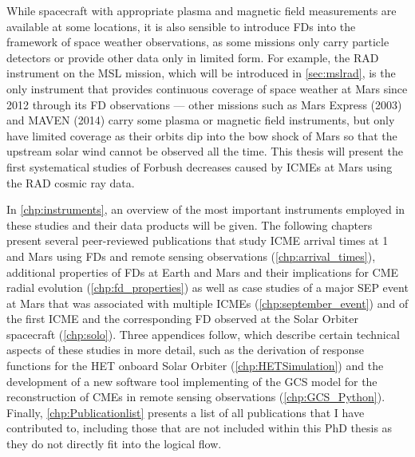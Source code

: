 While spacecraft with appropriate plasma and magnetic field measurements are available at some locations, it is also sensible to introduce \acp{FD} into the framework of space weather observations, as some missions only carry particle detectors or provide other data only in limited form. For example, the \ac{RAD} instrument on the \ac{MSL} mission, which will be introduced in \autoref{sec:mslrad}, is the only instrument that provides continuous coverage of space weather at Mars since 2012 through its \ac{FD} observations --- other missions such as Mars Express (2003) and MAVEN (2014) carry some plasma or magnetic field instruments, but only have limited coverage as their orbits dip into the bow shock of Mars so that the upstream solar wind cannot be observed all the time. This thesis will present the first systematical studies of Forbush decreases caused by \acp{ICME} at Mars using the \ac{RAD} cosmic ray data.

In \autoref{chp:instruments}, an overview of the most important instruments employed in these studies and their data products will be given. The following chapters present several peer-reviewed publications that study \ac{ICME} arrival times at \SI{1}{\AU} and Mars using \acp{FD} and remote sensing observations (\autoref{chp:arrival_times}), additional properties of \acp{FD} at Earth and Mars and their implications for \ac{CME} radial evolution (\autoref{chp:fd_properties}) as well as case studies of a major \ac{SEP} event at Mars that was associated with multiple \acp{ICME} (\autoref{chp:september_event}) and of the first \ac{ICME} and the corresponding \ac{FD} observed at the Solar Orbiter spacecraft (\autoref{chp:solo}). Three appendices follow, which describe certain technical aspects of these studies in more detail, such as the derivation of response functions for the \ac{HET} onboard Solar Orbiter (\autoref{chp:HETSimulation}) and the development of a new software tool implementing of the \ac{GCS} model for the reconstruction of \acp{CME} in remote sensing observations (\autoref{chp:GCS_Python}). Finally, \autoref{chp:Publicationlist} presents a list of all publications that I have contributed to, including those that are not included within this PhD thesis as they do not directly fit into the logical flow.
